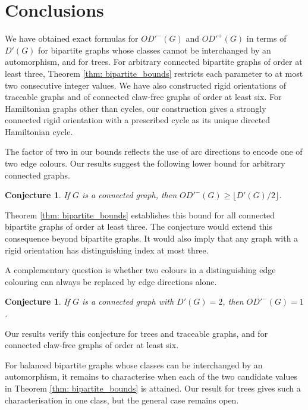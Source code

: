 \documentclass[a4paper,12pt]{elsarticle}
\newtheorem{conjecture}[theorem]{Conjecture}
\begin{document}
\section{Conclusions}

We have obtained exact formulas for $OD'^-(G)$ and $OD'^+(G)$ in terms of $D'(G)$ for bipartite graphs whose classes cannot be interchanged by an automorphism, and for trees. For arbitrary connected bipartite graphs of order at least three, Theorem \ref{thm: bipartite_bounds} restricts each parameter to at most two consecutive integer values. We have also constructed rigid orientations of traceable graphs and of connected claw-free graphs of order at least six. For Hamiltonian graphs other than cycles, our construction gives a strongly connected rigid orientation with a prescribed cycle as its unique directed Hamiltonian cycle.

The factor of two in our bounds reflects the use of arc directions to encode one of two edge colours. Our results suggest the following lower bound for arbitrary connected graphs.

\begin{conjecture}
If $G$ is a connected graph, then $OD'^-(G) \geq \lfloor D'(G)/2 \rfloor$.
\end{conjecture}

Theorem \ref{thm: bipartite_bounds} establishes this bound for all connected bipartite graphs of order at least three. The conjecture would extend this consequence beyond bipartite graphs. It would also imply that any  graph with a rigid orientation has distinguishing index at most three.

A complementary question is whether two colours in a distinguishing edge colouring can always be replaced by edge directions alone.

\begin{conjecture}
If $G$ is a connected graph with $D'(G)=2$, then $OD'^-(G) = 1$.
\end{conjecture}

Our results verify this conjecture for trees and traceable graphs, and for connected claw-free graphs of order at least six.

For balanced bipartite graphs whose classes can be interchanged by an automorphism, it remains to characterise when each of the two candidate values in Theorem \ref{thm: bipartite_bounds} is attained. Our result for trees gives such a characterisation in one class, but the general case remains open.
\end{document}
